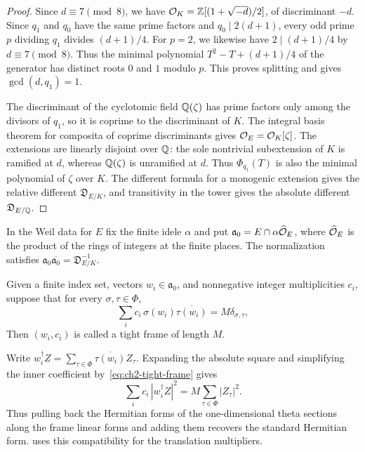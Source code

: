 \begin{proof}
Since $d\equiv7\pmod8$, we have $\mathcal{O}_K=\mathbb{Z}[(1+\sqrt{-d})/2]$, of discriminant $-d$. Since $q_1$ and $q_0$ have the same prime factors and $q_0\mid2(d+1)$, every odd prime $p$ dividing $q_1$ divides $(d+1)/4$. For $p=2$, we likewise have $2\mid(d+1)/4$ by $d\equiv7\pmod8$. Thus the minimal polynomial $T^2-T+(d+1)/4$ of the generator has distinct roots $0$ and $1$ modulo $p$. This proves splitting and gives $\gcd(d,q_1)=1$.

The discriminant of the cyclotomic field $\mathbb{Q}(\zeta)$ has prime factors only among the divisors of $q_1$, so it is coprime to the discriminant of $K$. The integral basis theorem for composita of coprime discriminants gives $\mathcal{O}_E=\mathcal{O}_K[\zeta]$. The extensions are linearly disjoint over $\mathbb{Q}$: the sole nontrivial subextension of $K$ is ramified at $d$, whereas $\mathbb{Q}(\zeta)$ is unramified at $d$. Thus $\Phi_{q_1}(T)$ is also the minimal polynomial of $\zeta$ over $K$. The different formula for a monogenic extension gives the relative different $\mathfrak D_{E/K}$, and transitivity in the tower gives the absolute different $\mathfrak D_{E/\mathbb{Q}}$.
\end{proof}

In the Weil data for $E$ fix the finite idele $\alpha$ and put $\mathfrak a_0=E\cap\alpha\widehat{\mathcal{O}}_E$, where $\widehat{\mathcal{O}}_E$ is the product of the rings of integers at the finite places. The normalization satisfies $\mathfrak a_0\overline{\mathfrak a_0}=\mathfrak D_{E/K}^{-1}$.

\begin{definition}
\label{def:ch2-tight-frame}
\emitthmsource
Given a finite index set, vectors $w_i\in\mathfrak a_0$, and nonnegative integer multiplicities $c_i$, suppose that for every $\sigma,\tau\in\Phi$,
\begin{equation}
\label{eq:ch2-tight-frame}
 \sum_i c_i\,\sigma(w_i)\overline{\tau(w_i)}=M\delta_{\sigma,\tau},
\end{equation}
Then $(w_i,c_i)$ is called a tight frame of length $M$.
\end{definition}

Write $w_i^\dagger Z=\sum_{\tau\in\Phi}\overline{\tau(w_i)}Z_\tau$. Expanding the absolute square and simplifying the inner coefficient by~\eqref{eq:ch2-tight-frame} gives
\begin{equation}
\label{eq:ch2-tight-frame-norm}
 \sum_i c_i\,|w_i^\dagger Z|^2=M\sum_{\tau\in\Phi}|Z_\tau|^2.
\end{equation}
Thus pulling back the Hermitian forms of the one-dimensional theta sections along the frame linear forms and adding them recovers the standard Hermitian form.  uses this compatibility for the translation multipliers.

